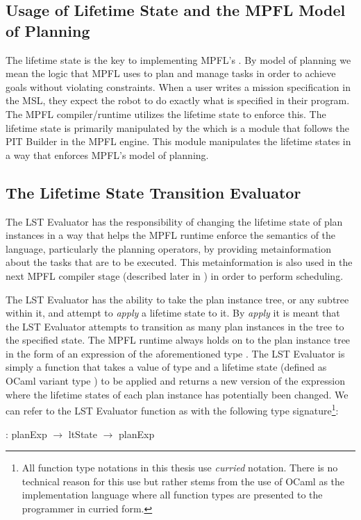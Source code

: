 \subsection{Usage of Lifetime State and the MPFL Model of Planning}
The lifetime state is the key to implementing MPFL's . By model of planning we mean the logic that MPFL uses to plan and manage tasks in order to achieve goals without violating constraints. When a user writes a mission specification in the MSL, they expect the robot to do exactly what is specified in their program. The MPFL compiler/runtime utilizes the lifetime state to enforce this. The lifetime state is primarily manipulated by the  which is a module that follows the PIT Builder in the MPFL engine. This module manipulates the lifetime states in a way that enforces MPFL's model of planning.

\subsection{The Lifetime State Transition Evaluator}
The LST Evaluator has the responsibility of changing the lifetime state of plan instances in a way that helps the MPFL runtime enforce the semantics of the language, particularly the planning operators, by providing metainformation about the tasks that are to be executed. This metainformation is also used in the next MPFL compiler stage (described later in ) in order to perform scheduling.

The LST Evaluator has the ability to take the plan instance tree, or any subtree within it, and attempt to \emph{apply} a lifetime state to it. By \textit{apply} it is meant that the LST Evaluator attempts to transition as many plan instances in the tree to the specified state. The MPFL runtime always holds on to the plan instance tree in the form of an expression of the aforementioned type . The LST Evaluator is simply a function that takes a value of type  and a lifetime state (defined as OCaml variant type ) to be applied and returns a new version of the  expression where the lifetime states of each plan instance has potentially been changed. We can refer to the LST Evaluator function as  with the following type signature\footnote{All function type notations in this thesis use \textit{curried} notation. There is no technical reason for this use but rather stems from the use of OCaml as the implementation language where all function types are presented to the programmer in curried form.}:
\begin{center}
 : planExp $\rightarrow$ ltState $\rightarrow$ planExp
\end{center}

